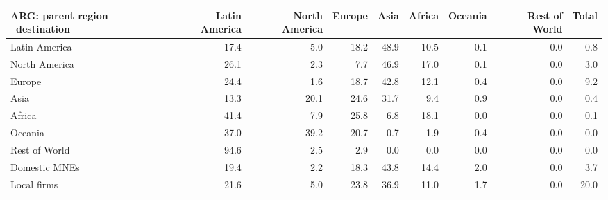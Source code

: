 \begin{tabular}{lrrrrrrrr}
\toprule
ARG: parent region \ destination & Latin America & North America & Europe & Asia & Africa & Oceania & Rest of World & Total \\
\midrule
Latin America & 17.4 & 5.0 & 18.2 & 48.9 & 10.5 & 0.1 & 0.0 & 0.8 \\
North America & 26.1 & 2.3 & 7.7 & 46.9 & 17.0 & 0.1 & 0.0 & 3.0 \\
Europe & 24.4 & 1.6 & 18.7 & 42.8 & 12.1 & 0.4 & 0.0 & 9.2 \\
Asia & 13.3 & 20.1 & 24.6 & 31.7 & 9.4 & 0.9 & 0.0 & 0.4 \\
Africa & 41.4 & 7.9 & 25.8 & 6.8 & 18.1 & 0.0 & 0.0 & 0.1 \\
Oceania & 37.0 & 39.2 & 20.7 & 0.7 & 1.9 & 0.4 & 0.0 & 0.0 \\
Rest of World & 94.6 & 2.5 & 2.9 & 0.0 & 0.0 & 0.0 & 0.0 & 0.0 \\
Domestic MNEs & 19.4 & 2.2 & 18.3 & 43.8 & 14.4 & 2.0 & 0.0 & 3.7 \\
Local firms & 21.6 & 5.0 & 23.8 & 36.9 & 11.0 & 1.7 & 0.0 & 20.0 \\
\bottomrule
\end{tabular}
